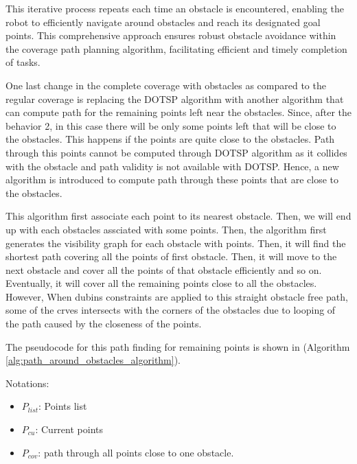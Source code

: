 This iterative process repeats each time an obstacle is encountered, enabling the robot to efficiently navigate around obstacles and reach its designated goal points. This comprehensive approach ensures robust obstacle avoidance within the coverage path planning algorithm, facilitating efficient and timely completion of tasks.

\vspace*{6mm}  

One last change in the complete coverage with obstacles as compared to the regular coverage is replacing the DOTSP algorithm with another algorithm that can compute path for the remaining points left near the obstacles. Since, after the behavior 2, in this case there will be only some points left that will be close to the obstacles. This happens if the points are quite close to the obstacles. Path through this points cannot be computed through DOTSP algorithm as it collides with the obstacle and path validity is not available with DOTSP. Hence, a new algorithm is introduced to compute path through these points that are close to the obstacles.  

\vspace*{6mm}  

This algorithm first associate each point to its nearest obstacle. Then, we will end up with each obstacles assciated with some points. Then, the algorithm first generates the visibility graph for each obstacle with points. Then, it will find the shortest path covering all the points of first obstacle. Then, it will move to the next obstacle and cover all the points of that obstacle efficiently and so on. Eventually, it will cover all the remaining points close to all the obstacles. However, When dubins constraints are applied to this straight obstacle free path, some of the crves intersects with the corners of the obstacles due to looping of the path caused by the closeness of the points. 


\vspace{6mm}  

The pseudocode for this path finding for remaining points is shown in (Algorithm \autoref{alg:path_around_obstacles_algorithm}). 



Notations:
\begin{itemize}[noitemsep,topsep=0pt]
    \item $P_{list}$: Points list
    \item $P_{cu}$: Current points
    \item $P_{cov}$: path through all points close to one obstacle.  
\end{itemize}

